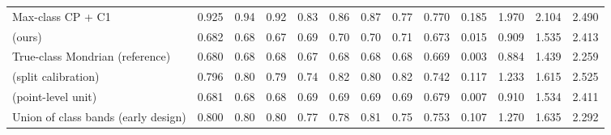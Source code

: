 \begin{table}[!htbp]
{\begin{tabular}{lcccccccccccc}
Max-class CP + C1 & 0.925 & 0.94 & 0.92 & 0.83 & 0.86 & 0.87 & 0.77 & 0.770 & 0.185 & 1.970 & 2.104 & 2.490 \\
\gamut{} (ours) & 0.682 & 0.68 & 0.67 & 0.69 & 0.70 & 0.70 & 0.71 & 0.673 & 0.015 & 0.909 & 1.535 & 2.413 \\
True-class Mondrian (reference) & 0.680 & 0.68 & 0.68 & 0.67 & 0.68 & 0.68 & 0.68 & 0.669 & 0.003 & 0.884 & 1.439 & 2.259 \\
\gamut{} (split calibration) & 0.796 & 0.80 & 0.79 & 0.74 & 0.82 & 0.80 & 0.82 & 0.742 & 0.117 & 1.233 & 1.615 & 2.525 \\
\gamut{} (point-level unit) & 0.681 & 0.68 & 0.68 & 0.69 & 0.69 & 0.69 & 0.69 & 0.679 & 0.007 & 0.910 & 1.534 & 2.411 \\
Union of class bands (early design) & 0.800 & 0.80 & 0.80 & 0.77 & 0.78 & 0.81 & 0.75 & 0.753 & 0.107 & 1.270 & 1.635 & 2.292 \\
\bottomrule
\end{tabular}}
\end{table}
\FloatBarrier

